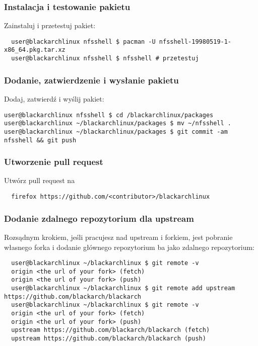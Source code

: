 \documentclass[a4paper, oneside, 11pt]{book}
\def\href#1#2{\htmladdnormallink{#2}{#1}}
\begin{document}
\subsubsection{Instalacja i testowanie pakietu}
Zainstaluj i przetestuj pakiet:
\begin{lstlisting}
  user@blackarchlinux nfsshell $ pacman -U nfsshell-19980519-1-x86_64.pkg.tar.xz
  user@blackarchlinux nfsshell $ nfsshell # przetestuj
\end{lstlisting}

\subsubsection{Dodanie, zatwierdzenie i wysłanie pakietu}
Dodaj, zatwierdź i wyślij pakiet:
\begin{lstlisting}
user@blackarchlinux nfsshell $ cd /blackarchlinux/packages
user@blackarchlinux ~/blackarchlinux/packages $ mv ~/nfsshell .
user@blackarchlinux ~/blackarchlinux/packages $ git commit -am nfsshell && git push
\end{lstlisting}

\subsubsection{Utworzenie pull request}
Utwórz pull request na \href{https://github.com/}{github.com}
\begin{lstlisting}
  firefox https://github.com/<contributor>/blackarchlinux
\end{lstlisting}

\subsubsection{Dodanie zdalnego repozytorium dla upstream}
Rozsądnym krokiem, jeśli pracujesz nad upstream i forkiem, jest pobranie własnego forka i dodanie głównego repozytorium ba jako zdalnego repozytorium:
\begin{lstlisting}
  user@blackarchlinux ~/blackarchlinux $ git remote -v
  origin <the url of your fork> (fetch)
  origin <the url of your fork> (push)
  user@blackarchlinux ~/blackarchlinux $ git remote add upstream https://github.com/blackarch/blackarch
  user@blackarchlinux ~/blackarchlinux $ git remote -v
  origin <the url of your fork> (fetch)
  origin <the url of your fork> (push)
  upstream https://github.com/blackarch/blackarch (fetch)
  upstream https://github.com/blackarch/blackarch (push)
\end{lstlisting}
\end{document}
